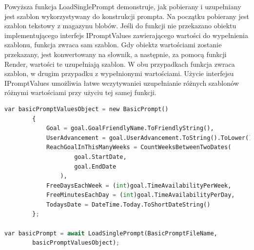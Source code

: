 Powyższa funkcja LoadSinglePrompt demonstruje, jak pobierany i uzupełniany jest szablon wykorzystywany do konstrukcji prompta. Na początku pobierany jest szablon tekstowy z magazynu blobów. Jeśli do funkcji nie przekazano obiektu implementującego interfejs IPromptValues zawierającego wartości do wypełnienia szablonu, funkcja zwraca sam szablon. Gdy obiekt\linebreak z wartościami zostanie przekazany, jest konwertowany na słownik, a następnie, za pomocą funkcji Render, wartości te uzupełniają szablon. W obu przypadkach funkcja zwraca szablon, w drugim przypadku z wypełnionymi wartościami. Użycie interfejsu IPromptValues umożliwia łatwe wczytywanie\linebreak i uzupełnianie różnych szablonów różnymi wartościami przy użyciu tej samej funkcji.

\begin{lstlisting}[language=Python, caption=Przykład wykorzystania funkcji LoadSinglePrompt, linewidth=160mm]
var basicPromptValuesObject = new BasicPrompt()
        {
            Goal = goal.GoalFriendlyName.ToFriendlyString(),
            UserAdvancement = goal.UserAdvancement.ToString().ToLower(),
            ReachGoalInThisManyWeeks = CountWeeksBetweenTwoDates(
                    goal.StartDate, 
                    goal.EndDate
                ),
            FreeDaysEachWeek = (int)goal.TimeAvailabilityPerWeek,
            FreeMinutesEachDay = (int)goal.TimeAvailabilityPerDay,
            TodaysDate = DateTime.Today.ToShortDateString()
        };
        
var basicPrompt = await LoadSinglePrompt(BasicPromptFileName, 
        basicPromptValuesObject);
\end{lstlisting}

